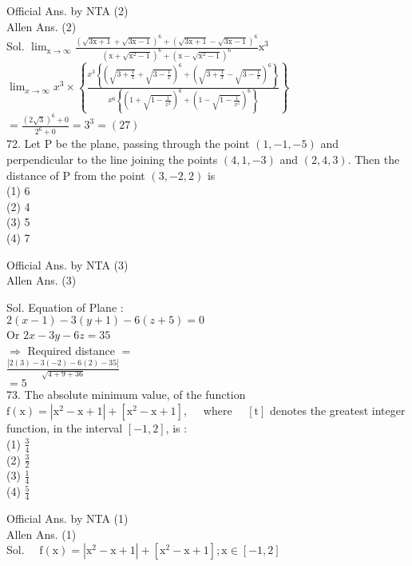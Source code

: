 \documentclass[10pt]{article}
\begin{document}
Official Ans. by NTA (2)\\
Allen Ans. (2)\\
Sol. \(\lim _{\mathrm{x} \rightarrow \infty} \frac{(\sqrt{3 \mathrm{x}+1}+\sqrt{3 \mathrm{x}-1})^{6}+(\sqrt{3 \mathrm{x}+1}-\sqrt{3 \mathrm{x}-1})^{6}}{\left(\mathrm{x}+\sqrt{\mathrm{x}^{2}-1}\right)^{6}+\left(\mathrm{x}-\sqrt{\mathrm{x}^{2}-1}\right)^{6}} \mathrm{x}^{3}\)\\
\(\lim _{x \rightarrow \infty} x^{3} \times\left\{\frac{x^{3}\left\{\left(\sqrt{3+\frac{1}{x}}+\sqrt{3-\frac{1}{x}}\right)^{6}+\left(\sqrt{3+\frac{1}{x}}-\sqrt{3-\frac{1}{x}}\right)^{6}\right\}}{x^{6}\left\{\left(1+\sqrt{1-\frac{1}{x^{2}}}\right)^{6}+\left(1-\sqrt{1-\frac{1}{x^{2}}}\right)^{6}\right\}}\right\}\)\\
\(=\frac{(2 \sqrt{3})^{6}+0}{2^{6}+0}=3^{3}=(27)\)\\
72. Let P be the plane, passing through the point \((1,-1,-5)\) and perpendicular to the line joining the points \((4,1,-3)\) and \((2,4,3)\). Then the distance of P from the point \((3,-2,2)\) is\\
(1) 6\\
(2) 4\\
(3) 5\\
(4) 7

Official Ans. by NTA (3)\\
Allen Ans. (3)

Sol. Equation of Plane :\\
\(2(x-1)-3(y+1)-6(z+5)=0\)\\
Or \(2 x-3 y-6 z=35\)\\
\(\Rightarrow\) Required distance \(=\)\\
\(\frac{|2(3)-3(-2)-6(2)-35|}{\sqrt{4+9+36}}\)\\
\(=5\)\\
73. The absolute minimum value, of the function \(\mathrm{f}(\mathrm{x})=\left|\mathrm{x}^{2}-\mathrm{x}+1\right|+\left[\mathrm{x}^{2}-\mathrm{x}+1\right], \quad\) where \(\quad[\mathrm{t}]\) denotes the greatest integer function, in the interval \([-1,2]\), is :\\
(1) \(\frac{3}{4}\)\\
(2) \(\frac{3}{2}\)\\
(3) \(\frac{1}{4}\)\\
(4) \(\frac{5}{4}\)

Official Ans. by NTA (1)\\
Allen Ans. (1)\\
Sol. \(\quad \mathrm{f}(\mathrm{x})=\left|\mathrm{x}^{2}-\mathrm{x}+1\right|+\left[\mathrm{x}^{2}-\mathrm{x}+1\right] ; \mathrm{x} \in[-1,2]\)
\end{document}
